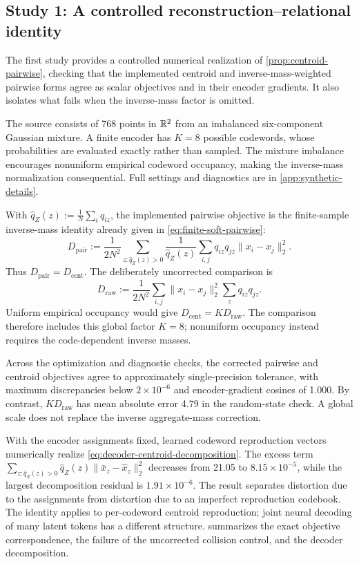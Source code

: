 \subsection{Study 1: A controlled reconstruction--relational identity}
\label{sec:synthetic-experiment}

The first study provides a controlled numerical realization of \cref{prop:centroid-pairwise}, checking that the implemented centroid and inverse-mass-weighted pairwise forms agree as scalar objectives and in their encoder gradients.
It also isolates what fails when the inverse-mass factor is omitted.

The source consists of 768 points in $\mathbb{R}^2$ from an imbalanced six-component Gaussian mixture.
A finite encoder has $K=8$ possible codewords, whose probabilities are evaluated exactly rather than sampled.
The mixture imbalance encourages nonuniform empirical codeword occupancy, making the inverse-mass normalization consequential.
Full settings and diagnostics are in \ref{app:synthetic-details}.

With $\hat q_Z(z):=\frac{1}{N}\sum_iq_{iz}$, the implemented pairwise objective is the finite-sample inverse-mass identity already given in \cref{eq:finite-soft-pairwise}:
\[
D_{\mathrm{pair}}
:=
\frac{1}{2N^2}
\sum_{z:\hat q_Z(z)>0}
\frac{1}{\hat q_Z(z)}
\sum_{i,j}
q_{iz}q_{jz}\|x_i-x_j\|_2^2.
\]
Thus $D_{\mathrm{pair}}=D_{\mathrm{cent}}$.
The deliberately uncorrected comparison is
\[
D_{\mathrm{raw}}
:=
\frac{1}{2N^2}
\sum_{i,j}
\|x_i-x_j\|_2^2
\sum_zq_{iz}q_{jz}.
\]
Uniform empirical occupancy would give $D_{\mathrm{cent}}=KD_{\mathrm{raw}}$.
The comparison therefore includes this global factor $K=8$; nonuniform occupancy instead requires the code-dependent inverse masses.

Across the optimization and diagnostic checks, the corrected pairwise and centroid objectives agree to approximately single-precision tolerance, with maximum discrepancies below $2\times10^{-6}$ and encoder-gradient cosines of 1.000.
By contrast, $KD_{\mathrm{raw}}$ has mean absolute error 4.79 in the random-state check.
A global scale does not replace the inverse aggregate-mass correction.

With the encoder assignments fixed, learned codeword reproduction vectors numerically realize \cref{eq:decoder-centroid-decomposition}.
The excess term $\sum_{z:\hat q_Z(z)>0}\hat q_Z(z)\|\bar x_z-\widehat x_z\|_2^2$ decreases from 21.05 to $8.15\times10^{-5}$, while the largest decomposition residual is $1.91\times10^{-6}$.
The result separates distortion due to the assignments from distortion due to an imperfect reproduction codebook.
The identity applies to per-codeword centroid reproduction; joint neural decoding of many latent tokens has a different structure.
 summarizes the exact objective correspondence, the failure of the uncorrected collision control, and the decoder decomposition.

